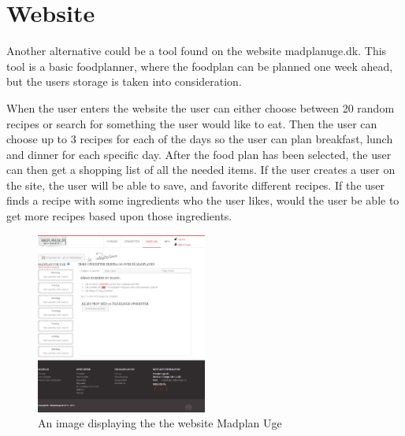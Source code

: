 \section{Website}
Another alternative could be a tool found on the website madplanuge.dk\cite{madSpild_madPlanUge}. This tool is a basic foodplanner, where the foodplan can be planned one week ahead, but the users storage is taken into consideration.

When the user enters the website the user can either choose between 20 random recipes or search for something the user would like to eat.
Then the user can choose up to 3 recipes for each of the days so the user can plan breakfast, lunch and dinner for each specific day.
After the food plan has been selected, the user can then get a shopping list of all the needed items.
If the user creates a user on the site, the user will be able to save, and favorite different recipes.
If the user finds a recipe with some ingredients who the user likes, would the user be able to get more recipes based upon those ingredients.

\begin{figure}[H]
    \centering
    \includegraphics[width=0.5\textwidth]{Grafik/madplanuge}
    \caption{An image displaying the the website Madplan Uge}
    \label{MadPlanUge}
\end{figure}
